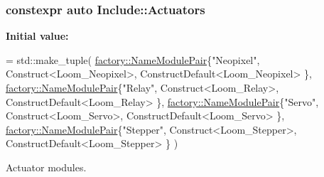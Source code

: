 \subsubsection[{\texorpdfstring{Actuators}{Actuators}}]{\setlength{\rightskip}{0pt plus 5cm}constexpr auto Include\+::\+Actuators}\hypertarget{namespace_include_a40e108fcc93c3c148487421aedb9a250}{}\label{namespace_include_a40e108fcc93c3c148487421aedb9a250}
{\bfseries Initial value\+:}
\begin{DoxyCode}
= std::make\_tuple(
                \hyperlink{structfactory_1_1_name_module_pair}{factory::NameModulePair}\{\textcolor{stringliteral}{"Neopixel"},      Construct<Loom\_Neopixel>,       
      ConstructDefault<Loom\_Neopixel> \},
                \hyperlink{structfactory_1_1_name_module_pair}{factory::NameModulePair}\{\textcolor{stringliteral}{"Relay"},     Construct<Loom\_Relay>,          
      ConstructDefault<Loom\_Relay> \},
                \hyperlink{structfactory_1_1_name_module_pair}{factory::NameModulePair}\{\textcolor{stringliteral}{"Servo"},     Construct<Loom\_Servo>,          
      ConstructDefault<Loom\_Servo> \},
                \hyperlink{structfactory_1_1_name_module_pair}{factory::NameModulePair}\{\textcolor{stringliteral}{"Stepper"},       Construct<Loom\_Stepper>,        
      ConstructDefault<Loom\_Stepper> \}
            )
\end{DoxyCode}


Actuator modules. 

